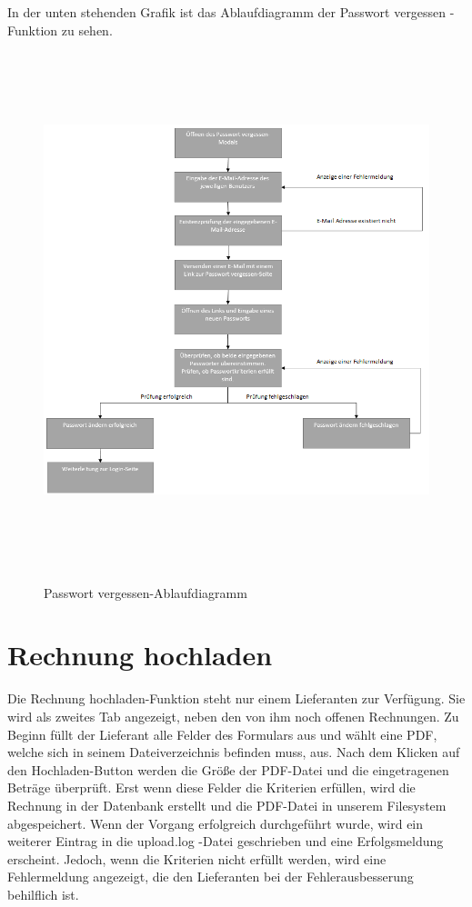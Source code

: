 \newpage
In der unten stehenden Grafik ist das Ablaufdiagramm der \glqq Passwort vergessen\grqq{} -Funktion zu sehen.
\begin{figure}[!h]
    \centering
    \includegraphics[width=17cm, height=15cm]{figures/vergessen.PNG}
    \label{fig:login}
    \caption{Passwort vergessen-Ablaufdiagramm}
\end{figure}
\newpage

\section{Rechnung hochladen}
Die \glqq Rechnung hochladen\grqq{}-Funktion steht nur einem Lieferanten zur Verfügung. Sie wird als zweites Tab angezeigt, neben den von ihm noch offenen Rechnungen. Zu Beginn füllt der Lieferant alle Felder des Formulars aus und wählt eine PDF, welche sich in seinem Dateiverzeichnis befinden muss, aus. Nach dem Klicken auf den Hochladen-Button werden die Größe der PDF-Datei und die eingetragenen Beträge überprüft. Erst wenn diese Felder die Kriterien erfüllen, wird die Rechnung in der Datenbank erstellt und die PDF-Datei in unserem Filesystem abgespeichert. Wenn der Vorgang erfolgreich durchgeführt wurde, wird ein weiterer Eintrag in die \glqq upload.log\grqq{} -Datei geschrieben und eine Erfolgsmeldung erscheint. Jedoch, wenn die Kriterien nicht erfüllt werden, wird eine Fehlermeldung angezeigt, die den Lieferanten bei der Fehlerausbesserung behilflich ist. \\

